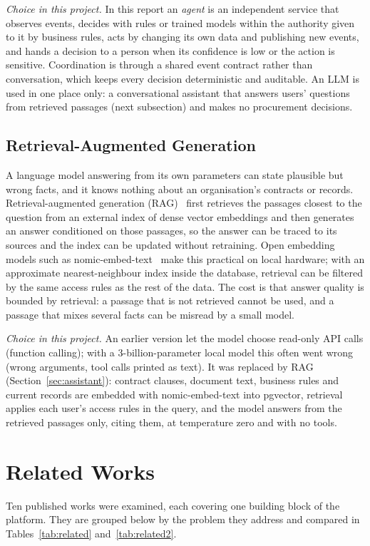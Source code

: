 \emph{Choice in this project.} In this report an \emph{agent} is an independent service that observes events, decides with rules or trained models within the authority given to it by business rules, acts by changing its own data and publishing new events, and hands a decision to a person when its confidence is low or the action is sensitive. Coordination is through a shared event contract rather than conversation, which keeps every decision deterministic and auditable. An LLM is used in one place only: a conversational assistant that answers users' questions from retrieved passages (next subsection) and makes no procurement decisions.

\subsection{Retrieval-Augmented Generation}
\label{sec:ragsurvey}
A language model answering from its own parameters can state plausible but wrong facts, and it knows nothing about an organisation's contracts or records. Retrieval-augmented generation (RAG)~\cite{lewis2020rag} first retrieves the passages closest to the question from an external index of dense vector embeddings and then generates an answer conditioned on those passages, so the answer can be traced to its sources and the index can be updated without retraining. Open embedding models such as nomic-embed-text~\cite{nussbaum2024nomic} make this practical on local hardware; with an approximate nearest-neighbour index inside the database, retrieval can be filtered by the same access rules as the rest of the data. The cost is that answer quality is bounded by retrieval: a passage that is not retrieved cannot be used, and a passage that mixes several facts can be misread by a small model.

\emph{Choice in this project.} An earlier version let the model choose read-only API calls (function calling); with a 3-billion-parameter local model this often went wrong (wrong arguments, tool calls printed as text). It was replaced by RAG (Section~\ref{sec:assistant}): contract clauses, document text, business rules and current records are embedded with nomic-embed-text into pgvector, retrieval applies each user's access rules in the query, and the model answers from the retrieved passages only, citing them, at temperature zero and with no tools.

\section{Related Works}
Ten published works were examined, each covering one building block of the platform. They are grouped below by the problem they address and compared in Tables~\ref{tab:related} and~\ref{tab:related2}.

